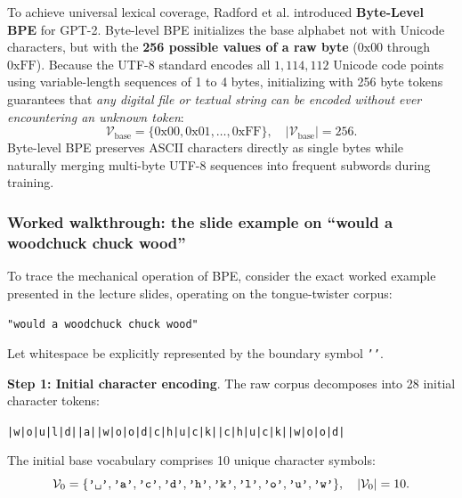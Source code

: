 \documentclass[../../../main.tex]{subfiles}
\begin{document}
To achieve universal lexical coverage, Radford et al. \cite{radford2019} introduced \textbf{Byte-Level BPE} for GPT-2. Byte-level BPE initializes the base alphabet not with Unicode characters, but with the \textbf{256 possible values of a raw byte} ($0\text{x}00$ through $0\text{xFF}$). Because the UTF-8 standard encodes all $1{,}114{,}112$ Unicode code points using variable-length sequences of 1 to 4 bytes, initializing with 256 byte tokens guarantees that \emph{any digital file or textual string can be encoded without ever encountering an unknown token}:
\begin{equation}
\label{eq:byte_level_bpe_init}
\mathcal{V}_{\text{base}} = \{0\text{x}00, 0\text{x}01, \dots, 0\text{xFF}\}, \quad |\mathcal{V}_{\text{base}}| = 256.
\end{equation}
Byte-level BPE preserves ASCII characters directly as single bytes while naturally merging multi-byte UTF-8 sequences into frequent subwords during training.

\subsubsection{Worked walkthrough: the slide example on ``would a woodchuck chuck wood''}
To trace the mechanical operation of BPE, consider the exact worked example presented in the lecture slides, operating on the tongue-twister corpus:
\begin{center}
\texttt{"would a woodchuck chuck wood"}
\end{center}
Let whitespace be explicitly represented by the boundary symbol \texttt{'\textvisiblespace{}'}.

\noindent\textbf{Step 1: Initial character encoding}.\newline
The raw corpus decomposes into 28 initial character tokens:
\begin{center}
\texttt{|w|o|u|l|d|\textvisiblespace{}|a|\textvisiblespace{}|w|o|o|d|c|h|u|c|k|\textvisiblespace{}|c|h|u|c|k|\textvisiblespace{}|w|o|o|d|}
\end{center}
The initial base vocabulary comprises 10 unique character symbols:
\begin{equation}
\mathcal{V}_0 = \{\text{\texttt{'\textvisiblespace{}'}}, \text{\texttt{'a'}}, \text{\texttt{'c'}}, \text{\texttt{'d'}}, \text{\texttt{'h'}}, \text{\texttt{'k'}}, \text{\texttt{'l'}}, \text{\texttt{'o'}}, \text{\texttt{'u'}}, \text{\texttt{'w'}}\}, \quad |\mathcal{V}_0| = 10.
\end{equation}
\end{document}
